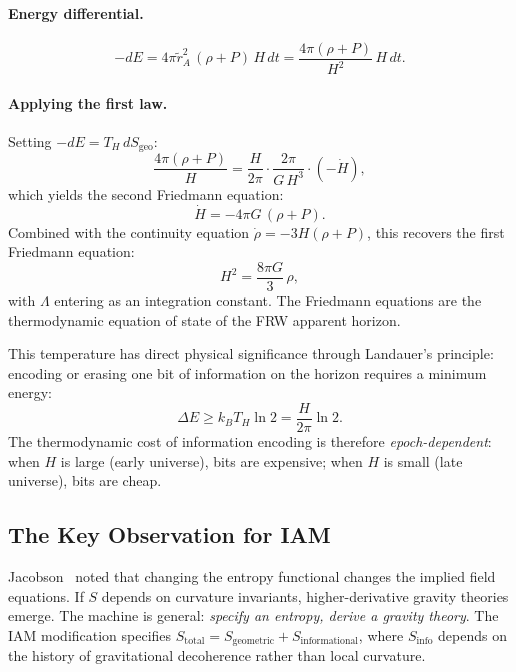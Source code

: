 \documentclass[11pt]{article}
\begin{document}
\paragraph{Energy differential.}
\begin{equation}
-dE = 4\pi\tilde{r}_A^2\,(\rho + P)\,H\,dt
= \frac{4\pi(\rho + P)}{H^2}\,H\,dt.
\label{eq:dE}
\end{equation}

\paragraph{Applying the first law.}
Setting $-dE = T_H\,dS_\mathrm{geo}$:
\begin{equation}
\frac{4\pi(\rho + P)}{H} = \frac{H}{2\pi}\cdot\frac{2\pi}{G\,H^3}\cdot(-\dot{H}),
\end{equation}
which yields the second Friedmann equation:
\begin{equation}
\dot{H} = -4\pi G\,(\rho + P).
\label{eq:friedmann2}
\end{equation}
Combined with the continuity equation $\dot{\rho} = -3H(\rho + P)$, this
recovers the first Friedmann equation:
\begin{equation}
H^2 = \frac{8\pi G}{3}\,\rho,
\label{eq:friedmann1}
\end{equation}
with $\Lambda$ entering as an integration constant.  The Friedmann equations
are the thermodynamic equation of state of the FRW apparent horizon.

This temperature has direct physical significance through Landauer's
principle: encoding or erasing one bit of information on the horizon
requires a minimum energy:
\begin{equation}
\Delta E \geq k_B T_H \ln 2 = \frac{H}{2\pi}\ln 2.
\label{eq:Landauer_horizon}
\end{equation}
The thermodynamic cost of information encoding is therefore
\textit{epoch-dependent}: when $H$ is large (early universe), bits are
expensive; when $H$ is small (late universe), bits are cheap.

\subsection{The Key Observation for IAM}

Jacobson~\citep{Jacobson1995} noted that changing the entropy functional
changes the implied field equations.  If $S$ depends on curvature invariants,
higher-derivative gravity theories emerge.  The machine is general:
\textit{specify an entropy, derive a gravity theory}.  The IAM modification
specifies $S_\mathrm{total} = S_\mathrm{geometric} + S_\mathrm{informational}$,
where $S_\mathrm{info}$ depends on the history of gravitational decoherence
rather than local curvature.
\end{document}
